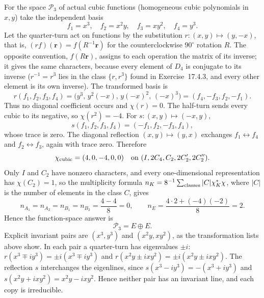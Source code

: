 For the space $\mathcal P_3$ of actual cubic functions (homogeneous
cubic polynomials in $x,y$) take the independent basis
\[
f_1=x^3,\quad f_2=x^2y,\quad f_3=xy^2,\quad f_4=y^3.
\]
Let the quarter-turn act on functions by the substitution
$r:(x,y)\mapsto(y,-x)$, that is, $(rf)(\mathbf r)=f(R^{-1}\mathbf r)$
for the counterclockwise $90^\circ$ rotation $R$. The opposite
convention, $f(R\mathbf r)$, assigns to each operation the matrix of
its inverse; it gives the same characters, because every element of
$D_4$ is conjugate to its inverse ($r^{-1}=r^3$ lies in the class
$\{r,r^3\}$ found in Exercise~17.4.3, and every other element is its
own inverse). The transformed basis is
\[
r(f_1,f_2,f_3,f_4)=\bigl(y^3,\,y^2(-x),\,y(-x)^2,\,(-x)^3\bigr)
=(f_4,-f_3,f_2,-f_1).
\]
Thus no diagonal coefficient occurs and $\chi(r)=0$.
The half-turn sends every cubic to its negative, so $\chi(r^2)=-4$.
For $s:(x,y)\mapsto(-x,y)$,
\[
s(f_1,f_2,f_3,f_4)=(-f_1,f_2,-f_3,f_4),
\]
whose trace is zero. The diagonal reflection
$(x,y)\mapsto(y,x)$ exchanges $f_1\leftrightarrow f_4$ and
$f_2\leftrightarrow f_3$, again with trace zero. Therefore
\[
\chi_{\rm cubic}=(4,0,-4,0,0)
\quad\text{on }(I,2C_4,C_2,2C_2',2C_2'').
\]
Only $I$ and $C_2$ have nonzero characters, and every
one-dimensional representation has $\chi(C_2)=1$, so the
multiplicity formula $n_K=8^{-1}\sum_{\rm classes}|C|\chi_K^*\chi$, where
$|C|$ is the number of elements in the class $C$, gives
\[
n_{A_1}=n_{A_2}=n_{B_1}=n_{B_2}=\frac{4-4}{8}=0,\qquad
n_E=\frac{4\cdot2+(-4)(-2)}8=2.
\]
Hence the function-space answer is
\[
\boxed{\mathcal P_3=E\oplus E}.
\]
Explicit invariant pairs are $(x^3,y^3)$ and $(x^2y,xy^2)$, as the
transformation lists above show. In each pair a quarter-turn has
eigenvalues $\pm i$:
$r(x^3\mp iy^3)=\pm i(x^3\mp iy^3)$ and
$r(x^2y\pm ixy^2)=\pm i(x^2y\pm ixy^2)$. The reflection $s$
interchanges the eigenlines, since
$s(x^3-iy^3)=-(x^3+iy^3)$ and $s(x^2y+ixy^2)=x^2y-ixy^2$.
Hence neither pair has an invariant line, and each copy is irreducible.

